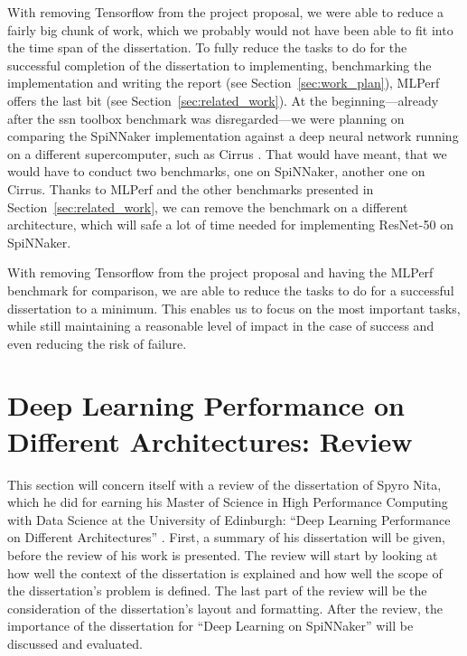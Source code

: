\documentclass{article}
\begin{document}
%
%
%

With removing Tensorflow from the project proposal, we
were able to reduce a fairly big chunk of work, which we
probably would not have been able to fit into the time
span of the dissertation.
To fully reduce the tasks to do for the successful
completion of the dissertation to implementing,
benchmarking the implementation and writing the report
(see Section~\ref{sec:work_plan}), MLPerf offers the last
bit (see Section~\ref{sec:related_work}).
At the beginning---already after the ssn toolbox benchmark
was disregarded---we were planning on comparing the
SpiNNaker implementation against a deep neural network
running on a different supercomputer, such as Cirrus
\citep{cirrus}.
That would have meant, that we would have to conduct two
benchmarks, one on SpiNNaker, another one on Cirrus.
Thanks to MLPerf and the other benchmarks presented in
Section~\ref{sec:related_work}, we can remove the
benchmark on a different architecture, which will safe
a lot of time needed for implementing ResNet-50 on
SpiNNaker.

With removing Tensorflow from the project proposal and
having the MLPerf benchmark for comparison, we are able
to reduce the tasks to do for a successful dissertation to
a minimum.
This enables us to focus on the most important tasks, while
still maintaining a reasonable level of impact in the case
of success and even reducing the risk of failure.


\section{Deep Learning Performance on Different %
  Architectures: Review}
\label{sec:review}

This section will concern itself with a review of the
dissertation of Spyro Nita, which he did for earning his
Master of Science in High Performance Computing with Data
Science at the University of Edinburgh:
``Deep Learning Performance on Different Architectures''
 \citep{nita_2018}.
First, a summary of his dissertation will be given, before
the review of his work is presented.
The review will start by looking at how well the context
of the dissertation is explained and how well the scope
of the dissertation's problem is defined.
The last part of the review will be the consideration of
the dissertation's layout and formatting.
After the review, the importance of the dissertation for
``Deep Learning on SpiNNaker'' will be discussed and
evaluated.
\end{document}
